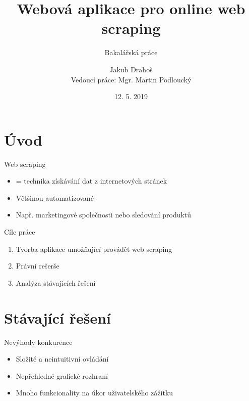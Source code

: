 \documentclass[czech,aspectratio=169]{beamer}
\title[Webová aplikace pro online web scraping]{Webová aplikace pro online web scraping}
\subtitle{Bakalářská práce}
\institute[FIT ČVUT v Praze]{Fakulta informačních technologií \\ České vysoké učení technické v Praze}
\author[J. Drahoš]{Jakub Drahoš \\ Vedoucí práce: Mgr. Martin Podloucký}
\date{12. 5. 2019}
\begin{document}
	\begin{frame}
		\titlepage
	\end{frame}

	\begin{frame}
		\tableofcontents 
	\end{frame}
	
	
	\section{Úvod}
	\begin{frame}{Web scraping}
		\begin{itemize}
			\item = technika získávání dat z internetových stránek
			\item Většinou automatizované
			\item Např. marketingové společnosti nebo sledování produktů
		\end{itemize}
	\end{frame}

	\begin{frame}{Cíle práce}
		\begin{enumerate}
			\item Tvorba aplikace umožňující provádět web scraping
			\item Právní rešerše
			\item Analýza stávajících řešení
		\end{enumerate}
	\end{frame}

	
	\section{Stávající řešení}
	\begin{frame}{Nevýhody konkurence}
		\begin{itemize}
			\item Složité a neintuitivní ovládání
			\item Nepřehledné grafické rozhraní
			\item Mnoho funkcionality na úkor uživatelského zážitku
		\end{itemize}
	\end{frame}
\end{document}
